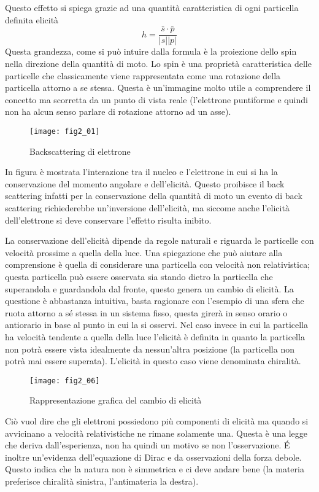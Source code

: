 Questo effetto si spiega grazie ad una quantità caratteristica di ogni particella definita elicità
\begin{equation}
h=\frac{\bar s\cdot \bar p}{|s||p|}
\end{equation}
Questa grandezza, come si può intuire dalla formula è la proiezione dello spin nella direzione della quantità di moto.
Lo spin è una proprietà caratteristica delle particelle che classicamente viene rappresentata come una rotazione della particella attorno a se stessa. Questa è un'immagine molto utile a comprendere il concetto ma scorretta da un punto di vista reale (l'elettrone puntiforme e quindi non ha alcun senso parlare di rotazione attorno ad un asse).

\begin{figure}[h]
\centering
\texttt{[image: fig2\_01]}
\caption{Backscattering di elettrone}
\label{fig:2.01}
\end{figure}
In figura è mostrata l'interazione tra il nucleo e l'elettrone in cui si ha la conservazione del momento angolare e dell'elicità.
Questo proibisce il back scattering infatti per la conservazione della quantità di moto un evento di back scattering richiederebbe un'inversione dell'elicità, ma siccome anche l'elicità dell'elettrone si deve conservare l'effetto risulta inibito.

La conservazione dell'elicità dipende da regole naturali e riguarda le particelle con velocità prossime a quella della luce.
Una spiegazione che può aiutare alla comprensione è quella di considerare una particella con velocità non relativistica; questa particella può essere osservata sia stando dietro la particella che superandola e guardandola dal fronte, questo genera un cambio di elicità.
La questione è abbastanza intuitiva, basta ragionare con l'esempio di una sfera che ruota attorno a sé stessa in un sistema fisso, questa girerà in senso orario o antiorario in base al punto in cui la si osservi.
Nel caso invece in cui la particella ha velocità tendente a quella della luce l'elicità è definita in quanto la particella non potrà essere vista idealmente da nessun'altra posizione (la particella non potrà mai essere superata).
L'elicità in questo caso viene denominata chiralità.
\begin{figure}[h]
\centering
\texttt{[image: fig2\_06]}
\caption{Rappresentazione grafica del cambio di elicità}
\end{figure}

Ciò vuol dire che gli elettroni possiedono più componenti di elicità ma quando si avvicinano a velocità relativistiche ne rimane solamente una. Questa è una legge che deriva dall'esperienza, non ha quindi un motivo se non l'osservazione.
\'E inoltre un'evidenza dell'equazione di Dirac e da osservazioni della forza debole.
Questo indica che la natura non è simmetrica e ci deve andare bene (la materia preferisce chiralità sinistra, l'antimateria la destra).

